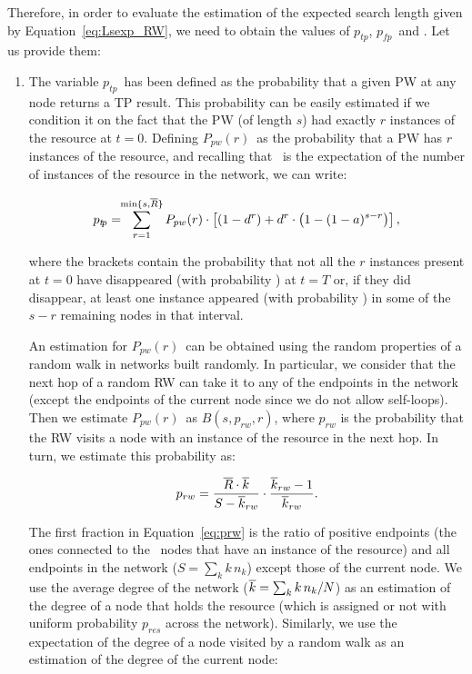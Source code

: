 \documentclass[]{elsarticle}
\newcommand{\s}		{\ensuremath{s}}		\newcommand{\sopt}	{\ensuremath{s_{opt}}}		\newcommand{\p}		{\ensuremath{p}}		\newcommand{\W}		{\ensuremath{W}}		\newcommand{\w}		{\ensuremath{w}}		\newcommand{\lsave}	{\ensuremath{\overline{l}_s}}	\newcommand{\lave}	{\ensuremath{\overline{l}}}	\newcommand{\lopt}	{\ensuremath{\overline{l}_{opt}}}
\newcommand{\ptp}       {\ensuremath{p_{t\!p}}}
\newcommand{\pfp}       {\ensuremath{p_{\!f\!p}}}
\newcommand{\PWx}[1]    {\ensuremath{P_{pw}(#1)}}
\newcommand{\pnoderes}  {\ensuremath{p_{res}}}
\newcommand{\nk}        {\ensuremath{n_k}}
\begin{document}
Therefore, in order to evaluate the estimation of the expected search length given by Equation~\ref{eq:Lsexp_RW}, we need to obtain the values of \ptp, \pfp\ and \Texp. Let us provide them:

\begin{enumerate}
\item

The variable \ptp\ has been defined as the probability that a given PW at any node returns a TP result. This probability can be easily estimated if we condition it on the fact that the PW (of length \s) had exactly $r$ instances of the resource at $t\!=\!0$. Defining \PWx{r}\ as the probability that a PW has $r$ instances of the resource, and recalling that \R\ is the expectation of the number of instances of the resource in the network, we can write:

\begin{equation}
 \ptp = \!\! \sum_{r=1}^{\mathrm{min}\{\s,\R\}} \PWx{r} \cdot \left[(1-\pd^r) + d^r\cdot\left(1-(1-\pa)^{s-r}\right)\right],
 \label{eq:ptp}
\end{equation}

\noindent where the brackets contain the probability that not all the $r$ instances present at $t\!=\!0$ have disappeared (with probability \pd) at $t\!=\!T$ or, if they did disappear, at least one instance appeared (with probability \pa) in some of the $s-r$ remaining nodes in that interval.

An estimation for \PWx{r}\ can be obtained using the random properties of a random walk in networks built randomly. In particular, we consider that the next hop of a random RW can take it to any of the endpoints in the network (except the endpoints of the current node since we do not allow self-loops). Then we estimate \PWx{r}\ as $B(s,p_{rw},r)$, where $p_{rw}$ is the probability that the RW visits a node with an instance of the resource in the next hop. In turn, we estimate this probability as:

\begin{equation}
 p_{rw} = \frac{\overline{R}\cdot\overline{k}}{S-\overline{k}_{rw}} \cdot \frac{\overline{k}_{rw}-1}{\overline{k}_{rw}}.
 \label{eq:prw}
\end{equation}

\noindent The first fraction in Equation~\ref{eq:prw} is the ratio of positive endpoints (the ones connected to the \R\ nodes that have an instance of the resource) and all endpoints in the network ($S=\sum_k k\,\nk$) except those of the current node. We use the average degree of the network ($\kave=\sum_k k\,\nk/N$) as an estimation of the degree of a node that holds the resource (which is assigned or not with uniform probability $\pnoderes$ across the network). Similarly, we use the expectation of the degree of a node visited by a random walk as an estimation of the degree of the current node:


\end{enumerate}
\end{document}

